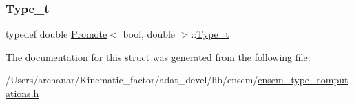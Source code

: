 \subsubsection{\texorpdfstring{Type\_t}{Type\_t}\hspace{0.1cm}{\footnotesize\ttfamily [2/2]}}
{\footnotesize\ttfamily typedef double \mbox{\hyperlink{structPromote}{Promote}}$<$ bool, double $>$\+::\mbox{\hyperlink{structPromote_3_01bool_00_01double_01_4_a89d90c1b19975ea58462741364f3d29e}{Type\+\_\+t}}}



The documentation for this struct was generated from the following file\+:\begin{DoxyCompactItemize}
\item 
/\+Users/archanar/\+Kinematic\+\_\+factor/adat\+\_\+devel/lib/ensem/\mbox{\hyperlink{lib_2ensem_2ensem__type__computations_8h}{ensem\+\_\+type\+\_\+computations.\+h}}\end{DoxyCompactItemize}
